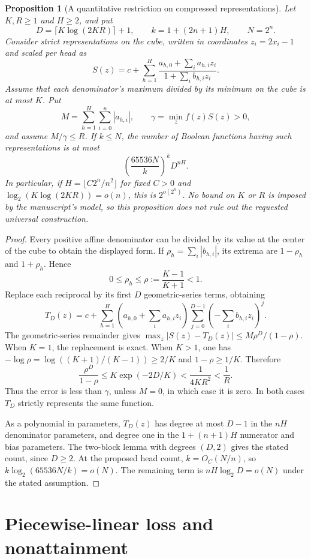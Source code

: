 \documentclass[11pt]{article}
\newtheorem{proposition}{Proposition}
\begin{document}
\begin{proposition}[A quantitative restriction on compressed representations]
Let $K,R\ge1$ and $H\ge2$, and put
\[
 D=\lceil K\log(2KR)\rceil+1,\qquad
 k=1+(2n+1)H,\qquad N=2^n.
\]
Consider strict representations on the cube, written in coordinates
$z_i=2x_i-1$ and scaled per head as
\[
 S(z)=c+\sum_{h=1}^H\frac{a_{h,0}+\sum_i a_{h,i}z_i}
                                  {1+\sum_i b_{h,i}z_i}.
\]
Assume that each denominator's maximum divided by its minimum on the
cube is at most $K$. Put
\[
 M=\sum_{h=1}^H\sum_{i=0}^n|a_{h,i}|,\qquad
 \gamma=\min_z f(z)S(z)>0,
\]
and assume $M/\gamma\le R$. If $k\le N$, the number of Boolean
functions having such representations is at most
\[
 \left(\frac{65536N}{k}\right)^k D^{nH}.
\]
In particular, if $H=\lfloor C2^n/n^2\rfloor$ for fixed $C>0$ and
$\log_2(K\log(2KR))=o(n)$, this is $2^{o(2^n)}$.
No bound on $K$ or $R$ is imposed by the manuscript's model, so this
proposition does not rule out the requested universal construction.
\end{proposition}
\begin{proof}
Every positive affine denominator can be divided by its value at the
center of the cube to obtain the displayed form. If
$\rho_h=\sum_i|b_{h,i}|$, its extrema are $1-\rho_h$ and
$1+\rho_h$. Hence
\[
 0\le\rho_h\le\rho:=\frac{K-1}{K+1}<1.
\]
Replace each reciprocal by its first $D$ geometric-series terms,
obtaining
\[
 T_D(z)=c+\sum_{h=1}^H
       \left(a_{h,0}+\sum_i a_{h,i}z_i\right)
       \sum_{j=0}^{D-1}\left(-\sum_i b_{h,i}z_i\right)^j.
\]
The geometric-series remainder gives
$\max_z|S(z)-T_D(z)|\le M\rho^D/(1-\rho)$.
When $K=1$, the replacement is exact. When $K>1$, one has
$-\log\rho=\log((K+1)/(K-1))\ge2/K$ and $1-\rho\ge1/K$.
Therefore
\[
 \frac{\rho^D}{1-\rho}
 \le K\exp(-2D/K)
 <\frac{1}{4KR^2}<\frac1R.
\]
Thus the error is less than $\gamma$, unless $M=0$, in which case
it is zero. In both cases $T_D$ strictly represents the same function.

As a polynomial in parameters, $T_D(z)$ has degree at most $D-1$ in
the $nH$ denominator parameters, and degree one in the
$1+(n+1)H$ numerator and bias parameters. The two-block lemma with
degrees $(D,2)$ gives the stated count, since $D\ge2$.
At the proposed head count, $k=O_C(N/n)$, so
$k\log_2(65536N/k)=o(N)$. The remaining term is
$nH\log_2D=o(N)$ under the stated assumption.
\end{proof}

\section{Piecewise-linear loss and nonattainment}
\end{document}
